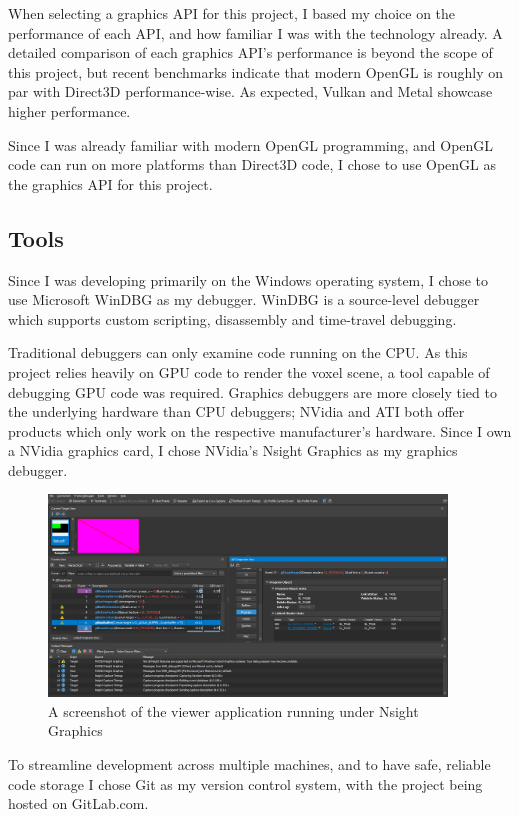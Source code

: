 When selecting a graphics API for this project, I based my choice on the performance of each API, and how familiar I was with the technology already. A detailed comparison of each graphics API's performance is beyond the scope of this project, but recent benchmarks indicate that modern OpenGL is roughly on par with Direct3D performance-wise. As expected, Vulkan and Metal showcase higher performance.

Since I was already familiar with modern OpenGL programming, and OpenGL code can run on more platforms than Direct3D code, I chose to use OpenGL as the graphics API for this project.

\subsection{Tools}
Since I was developing primarily on the Windows operating system, I chose to use Microsoft WinDBG as my debugger. WinDBG is a source-level debugger which supports custom scripting, disassembly and time-travel debugging.

Traditional debuggers can only examine code running on the CPU. As this project relies heavily on GPU code to render the voxel scene, a tool capable of debugging GPU code was required. Graphics debuggers are more closely tied to the underlying hardware than CPU debuggers; NVidia and ATI both offer products which only work on the respective manufacturer's hardware. Since I own a NVidia graphics card, I chose NVidia's Nsight Graphics as my graphics debugger.

\begin{figure}[h]
    \centering
    \includegraphics[width=400px]{graphics/nsight_screenshot.png}
    \caption{A screenshot of the viewer application running under Nsight Graphics}
    \label{fig:nsight_screenshot}
\end{figure}

To streamline development across multiple machines, and to have safe, reliable code storage I chose Git as my version control system, with the project being hosted on GitLab.com. 

